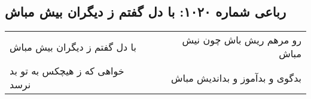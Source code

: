 \begin{center}
\section*{رباعی شماره ۱۰۲۰: با دل گفتم ز دیگران بیش مباش}
\label{sec:1020}
\begin{longtable}{l p{0.5cm} r}
با دل گفتم ز دیگران بیش مباش
&&
رو مرهم ریش باش چون نیش مباش
\\
خواهی که ز هیچکس به تو بد نرسد
&&
بدگوی و بدآموز و بداندیش مباش
\\
\end{longtable}
\end{center}
